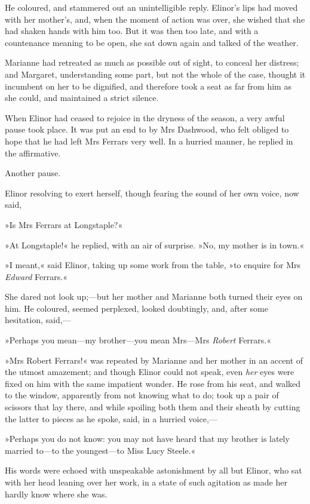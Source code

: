 He coloured, and stammered out an unintelligible reply. Elinor’s lips had moved with her mother’s, and, when the moment of action was over, she wished that she had shaken hands with him too. But it was then too late, and with a countenance meaning to be open, she sat down again and talked of the weather.

Marianne had retreated as much as possible out of sight, to conceal her distress; and Margaret, understanding some part, but not the whole of the case, thought it incumbent on her to be dignified, and therefore took a seat as far from him as she could, and maintained a strict silence.

When Elinor had ceased to rejoice in the dryness of the season, a very awful pause took place. It was put an end to by Mrs Dashwood, who felt obliged to hope that he had left Mrs Ferrars very well. In a hurried manner, he replied in the affirmative.

Another pause.

Elinor resolving to exert herself, though fearing the sound of her own voice, now said,

»Is Mrs Ferrars at Longstaple?«

»At Longstaple!« he replied, with an air of surprise. »No, my mother is in town.«

»I meant,« said Elinor, taking up some work from the table, »to enquire for Mrs \textit{Edward} Ferrars.«

She dared not look up;—but her mother and Marianne both turned their eyes on him. He coloured, seemed perplexed, looked doubtingly, and, after some hesitation, said,—

»Perhaps you mean—my brother—you mean Mrs—Mrs \textit{Robert} Ferrars.«

»Mrs Robert Ferrars!« was repeated by Marianne and her mother in an accent of the utmost amazement; and though Elinor could not speak, even \textit{her} eyes were fixed on him with the same impatient wonder. He rose from his seat, and walked to the window, apparently from not knowing what to do; took up a pair of scissors that lay there, and while spoiling both them and their sheath by cutting the latter to pieces as he spoke, said, in a hurried voice,—

»Perhaps you do not know: you may not have heard that my brother is lately married to—to the youngest—to Miss Lucy Steele.«

His words were echoed with unspeakable astonishment by all but Elinor, who sat with her head leaning over her work, in a state of such agitation as made her hardly know where she was.

